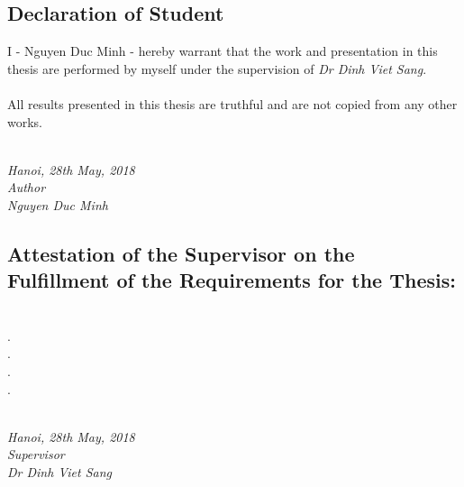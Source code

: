 \begin{spacing}{1.0}
  \section*{Declaration of Student}
  I - Nguyen Duc Minh - hereby warrant that the work and presentation in this
  thesis are performed by myself
  under the supervision of \textit{Dr Dinh Viet Sang}.\\\\
  All results presented in this thesis are truthful and are not copied from
  any other works.\\\\
  \begin{minipage}{0.5\textwidth}
    \hfill
  \end{minipage}
  \begin{minipage}[t]{0.5\textwidth}
    \begin{center}
      \textit{Hanoi, 28th May, 2018\\Author\\[1cm]Nguyen Duc Minh}
    \end{center}
  \end{minipage}
  \subsection*{Attestation of the Supervisor on the Fulfillment of the
  Requirements for the Thesis:}
  \dotfill\\.\dotfill\\.\dotfill\\.\dotfill\\.\dotfill\\\\
  \begin{minipage}{0.5\textwidth}
    \hfill
  \end{minipage}
  \begin{minipage}[t]{0.5\textwidth}
    \begin{center}
      \textit{Hanoi, 28th May, 2018\\Supervisor\\[1cm]Dr Dinh Viet Sang}
    \end{center}
  \end{minipage}
\end{spacing}
